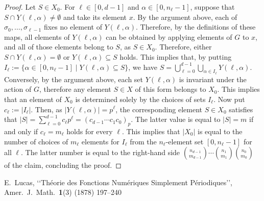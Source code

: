 ﻿\documentclass{article}
\theoremstyle{definition}
\begin{document}
\begin{proof}
    Let $S \in X_0$.
    For $\ell \in [0,d-1]$ and $\alpha \in [0,n_{\ell}-1]$, suppose that $S \cap Y(\ell,\alpha) \neq \emptyset$ and take its element $x$.
    By the argument above, each of $\sigma_0,\dots,\sigma_{\ell-1}$ fixes no element of $Y(\ell,\alpha)$.
    Therefore, by the definitions of these maps, all elements of $Y(\ell,\alpha)$ can be obtained by applying elements of $G$ to $x$, and all of those elements belong to $S$, as $S \in X_0$.
    Therefore, either $S \cap Y(\ell,\alpha) = \emptyset$ or $Y(\ell,\alpha) \subseteq S$ holds.
    This implies that, by putting $I_{\ell} := \{ \alpha \in [0,n_{\ell}-1] \mid Y(\ell,\alpha) \subseteq S \}$, we have $S = \bigcup_{\ell=0}^{d-1} \bigcup_{\alpha \in I_{\ell}} Y(\ell,\alpha)$.
    Conversely, by the argument above, each set $Y(\ell,\alpha)$ is invariant under the action of $G$, therefore any element $S \in X$ of this form belongs to $X_0$.
    This implies that an element of $X_0$ is determined solely by the choices of sets $I_{\ell}$.
    Now put $c_{\ell} := |I_{\ell}|$.
    Then, as $|Y(\ell,\alpha)| = p^{\ell}$, the corresponding element $S \in X_0$ satisfies that $|S| = \sum_{\ell=0}^{d-1} c_{\ell} p^{\ell} = (c_{d-1} \cdots c_1 c_0)_p$.
    The latter value is equal to $|S| = m$ if and only if $c_{\ell} = m_{\ell}$ holds for every $\ell$.
    This implies that $|X_0|$ is equal to the number of choices of $m_{\ell}$ elements for $I_{\ell}$ from the $n_{\ell}$-element set $[0,n_{\ell}-1]$ for all $\ell$.
    The latter number is equal to the right-hand side $\binom{ n_{d-1} }{ m_{d-1} } \cdots \binom{ n_1 }{ m_1 } \binom{ n_0 }{ m_0 }$ of the claim, concluding the proof.
\end{proof}


\begin{thebibliography}{9}

    E.~Lucas,
    \lq\lq Th\'{e}orie des Fonctions Num\'{e}riques Simplement P\'{e}riodiques\rq\rq,
    Amer.\ J.\ Math.\ \textbf{1}(3) (1878) 197--240

\end{thebibliography}
\end{document}
